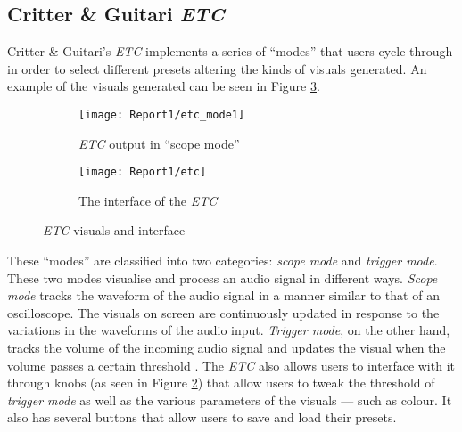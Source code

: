 \documentclass[../../main_report1.tex]{subfiles}
\begin{document}
\subsection{Critter \& Guitari \textit{ETC}}
Critter \& Guitari's \textit{ETC} implements a series of ``modes'' that users cycle through in order to select different presets altering the kinds of visuals generated. An example of the visuals generated can be seen in Figure \ref{fig:etc1}.

\begin{figure}[h]
  \begin{subfigure}{0.5\textwidth}
  \texttt{[image: Report1/etc\_mode1]}
  \caption{\textit{ETC} output in ``scope mode''}
  \label{fig:etc_mode1}
\end{subfigure}
\begin{subfigure}{0.5\textwidth}
  \texttt{[image: Report1/etc]}
  \caption{The interface of the \textit{ETC}}
  \label{fig:etc_interface}
\end{subfigure}
\caption{\textit{ETC} visuals and interface}
\label{fig:etc1}
\end{figure}

These ``modes'' are classified into two categories: \textit{scope mode} and \textit{trigger mode}. These two modes visualise and process an audio signal in different ways. \textit{Scope mode} tracks the waveform of the audio signal in a manner similar to that of an oscilloscope. The visuals on screen are continuously updated in response to the variations in the waveforms of the audio input. \textit{Trigger mode}, on the other hand, tracks the volume of the incoming audio signal and updates the visual when the volume passes a certain threshold \cite{ETCmanual}. The \textit{ETC} also allows users to interface with it through knobs (as seen in Figure \ref{fig:etc_interface}) that allow users to tweak the threshold of \textit{trigger mode} as well as the various parameters of the visuals --- such as colour. It also has several buttons that allow users to save and load their presets. \par
\end{document}
